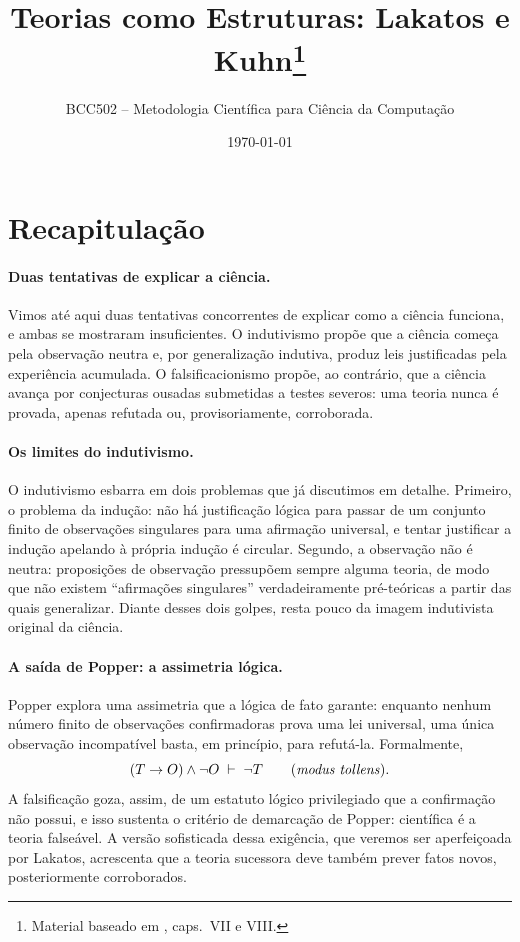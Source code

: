 \documentclass[9pt,a4paper]{extarticle}
\title{Teorias como Estruturas: Lakatos e Kuhn\footnote{Material baseado em \citep{chalmers1993}, caps.~VII e VIII.}}
\author{BCC502 -- Metodologia Científica para Ciência da Computação}
\date{\today}
\newcommand{\impt}[1]{\textcolor{important}{#1}}
\theoremstyle{definition}
\begin{document}
\maketitle
\tableofcontents

\section{Recapitulação}

\paragraph{Duas tentativas de explicar a ciência.}
Vimos até aqui duas tentativas concorrentes de explicar como a ciência funciona, e ambas se mostraram insuficientes. O \impt{indutivismo} propõe que a ciência começa pela observação neutra e, por generalização indutiva, produz leis justificadas pela experiência acumulada. O \impt{falsificacionismo} propõe, ao contrário, que a ciência avança por conjecturas ousadas submetidas a testes severos: uma teoria nunca é provada, apenas refutada ou, provisoriamente, corroborada.

\paragraph{Os limites do indutivismo.}
O indutivismo esbarra em dois problemas que já discutimos em detalhe. Primeiro, o \impt{problema da indução}: não há justificação lógica para passar de um conjunto finito de observações singulares para uma afirmação universal, e tentar justificar a indução apelando à própria indução é circular. Segundo, a observação \impt{não é neutra}: proposições de observação pressupõem sempre alguma teoria, de modo que não existem \enquote{afirmações singulares} verdadeiramente pré-teóricas a partir das quais generalizar. Diante desses dois golpes, resta pouco da imagem indutivista original da ciência.

\paragraph{A saída de Popper: a assimetria lógica.}
Popper explora uma assimetria que a lógica de fato garante: enquanto nenhum número finito de observações confirmadoras prova uma lei universal, uma única observação incompatível basta, em princípio, para refutá-la. Formalmente,
\[
(T \rightarrow O) \wedge \neg O \;\vdash\; \neg T \qquad \text{(\emph{modus tollens})}.
\]
A falsificação goza, assim, de um estatuto lógico privilegiado que a confirmação não possui, e isso sustenta o critério de demarcação de Popper: científica é a teoria \impt{falseável}. A versão sofisticada dessa exigência, que veremos ser aperfeiçoada por Lakatos, acrescenta que a teoria sucessora deve também prever fatos novos, posteriormente corroborados.
\end{document}
